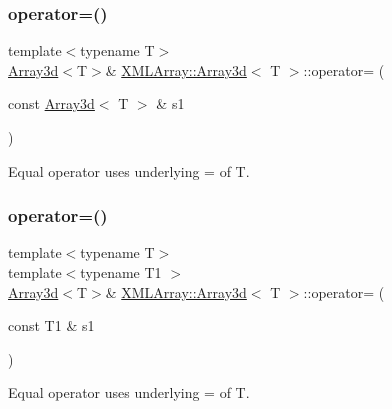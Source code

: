 \subsubsection{\texorpdfstring{operator=()}{operator=()}\hspace{0.1cm}{\footnotesize\ttfamily [3/6]}}
{\footnotesize\ttfamily template$<$typename T$>$ \\
\mbox{\hyperlink{classXMLArray_1_1Array3d}{Array3d}}$<$T$>$\& \mbox{\hyperlink{classXMLArray_1_1Array3d}{X\+M\+L\+Array\+::\+Array3d}}$<$ T $>$\+::operator= (\begin{DoxyParamCaption}\item[{const \mbox{\hyperlink{classXMLArray_1_1Array3d}{Array3d}}$<$ T $>$ \&}]{s1 }\end{DoxyParamCaption})\hspace{0.3cm}{\ttfamily [inline]}}



Equal operator uses underlying = of T. 

\mbox{\label{classXMLArray_1_1Array3d_a64543f39150c0d468eb6bef6ea73c1c6}} 
\subsubsection{\texorpdfstring{operator=()}{operator=()}\hspace{0.1cm}{\footnotesize\ttfamily [4/6]}}
{\footnotesize\ttfamily template$<$typename T$>$ \\
template$<$typename T1 $>$ \\
\mbox{\hyperlink{classXMLArray_1_1Array3d}{Array3d}}$<$T$>$\& \mbox{\hyperlink{classXMLArray_1_1Array3d}{X\+M\+L\+Array\+::\+Array3d}}$<$ T $>$\+::operator= (\begin{DoxyParamCaption}\item[{const T1 \&}]{s1 }\end{DoxyParamCaption})\hspace{0.3cm}{\ttfamily [inline]}}



Equal operator uses underlying = of T. 

\mbox{\label{classXMLArray_1_1Array3d_a64543f39150c0d468eb6bef6ea73c1c6}} 
